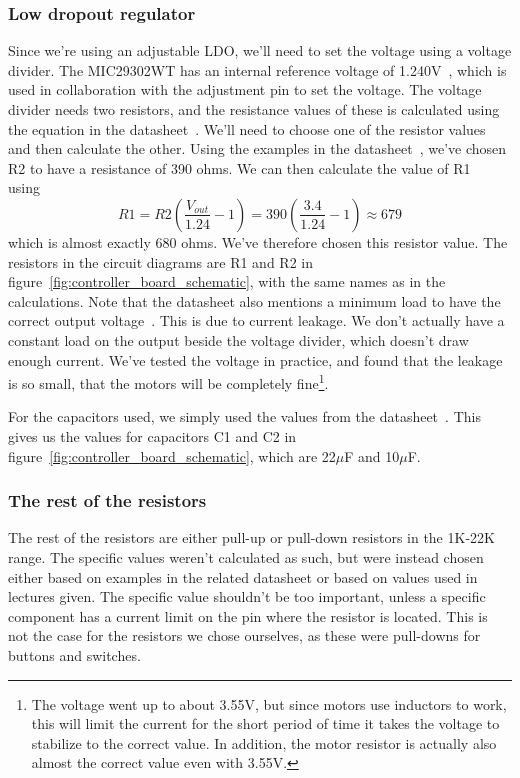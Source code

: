 \documentclass[acmsmall]{acmart}
\begin{document}
\subsubsection{Low dropout regulator}
Since we're using an adjustable LDO, we'll need to set the voltage using a voltage divider. The MIC29302WT has an internal reference voltage of 1.240V~\cite[][p.6]{ldo}, which is 
used in collaboration with the adjustment pin to set the voltage. The voltage divider needs two resistors, and the resistance values of these is calculated using the equation
in the datasheet~\cite[][p.25]{ldo}. We'll need to choose one of the resistor values and then calculate the other. Using the examples in the datasheet~\cite[][p.3]{ldo}, we've chosen 
R2 to have a resistance of 390 ohms. We can then calculate the value of R1 using~\cite[][p.25]{ldo}
\[
	R1=R2\left(\frac{V_{out}}{1.24}-1\right)=390\left(\frac{3.4}{1.24}-1\right)\approx 679
\]
which is almost exactly 680 ohms. We've therefore chosen this resistor value. The resistors in the circuit diagrams are R1 and R2 in figure~\ref{fig:controller_board_schematic}, 
with the same names as in the calculations. Note that the datasheet also mentions a minimum load to have the correct output voltage~\cite[][p.25]{ldo}. 
This is due to current leakage. We don't actually have a constant load on the output 
beside the voltage divider, which doesn't draw enough current. We've tested the voltage in practice, and found that the leakage is so small, that the motors will be 
completely fine\footnote{The voltage went up to about 3.55V, but since motors use inductors to work, this will limit the current for the short period of time it takes the
voltage to stabilize to the correct value. In addition, the motor resistor is actually also almost the correct value even with 3.55V.}. 

For the capacitors used, we simply used the values from the datasheet~\cite[][p.26]{ldo}. This gives us the values for capacitors 
C1 and C2 in figure~\ref{fig:controller_board_schematic}, which are 22$\mu$F and 10$\mu$F. 

\subsubsection{The rest of the resistors}
The rest of the resistors are either pull-up or pull-down resistors in the 1K-22K range. The specific values weren't calculated as such, but were instead chosen either 
based on examples in the related datasheet or based on values used in lectures given. The specific value shouldn't be too important, unless a specific component has a 
current limit on the pin where the resistor is located. This is not the case for the resistors we chose ourselves, as these were pull-downs for buttons and switches.
\end{document}
